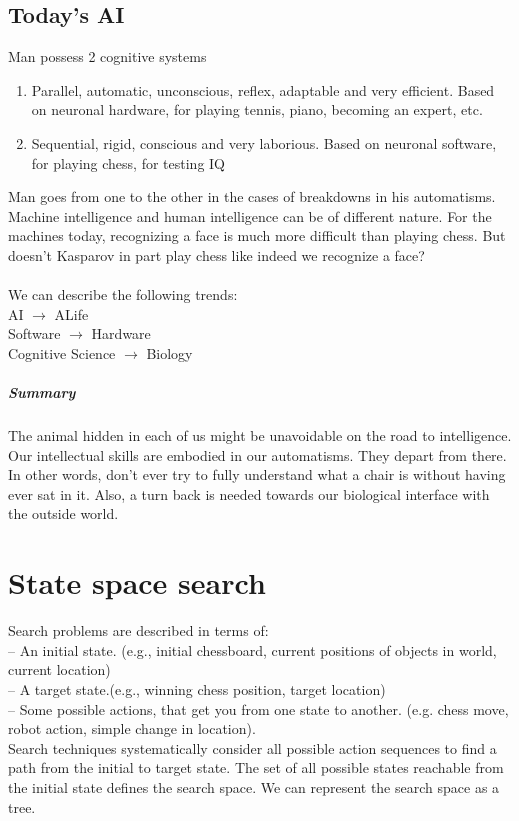 \section{Today's AI}
Man possess 2 cognitive systems
\begin{enumerate}
    \item Parallel, automatic, unconscious, reflex, adaptable and very efficient. Based on neuronal hardware, for playing tennis, piano, becoming an expert, etc.
    \item Sequential, rigid, conscious and very laborious. Based on neuronal software, for playing chess, for testing IQ
\end{enumerate}
Man goes from one to the other in the cases of breakdowns in his
automatisms. Machine intelligence and human intelligence can be of different nature. For the machines today, recognizing a face is much more difficult than playing chess. But doesn’t Kasparov in part play chess like indeed we recognize a face?\\
~\\
We can describe the following trends:\\
AI $\rightarrow$ ALife \\
Software $\rightarrow$ Hardware \\
Cognitive Science $\rightarrow$ Biology
\paragraph{Summary} The animal hidden in each of us might be unavoidable on the road to intelligence. Our intellectual skills are embodied in our automatisms. They depart from there. In other words, don’t ever try to fully understand what a chair is without having ever sat in it. Also, a turn back is needed towards our biological interface with the outside world.

\chapter{State space search}
Search problems are described in terms of: \\
– An initial state. (e.g., initial chessboard, current positions of objects in world, current location) \\
– A target state.(e.g., winning chess position, target location) \\
– Some possible actions, that get you from one state to another. (e.g. chess move, robot action, simple change in location). \\
\linebreak
Search techniques systematically consider all possible action sequences to find a path from the initial to target state. The set of all possible states reachable from the initial state defines the search space. We can represent the search space as a tree.

